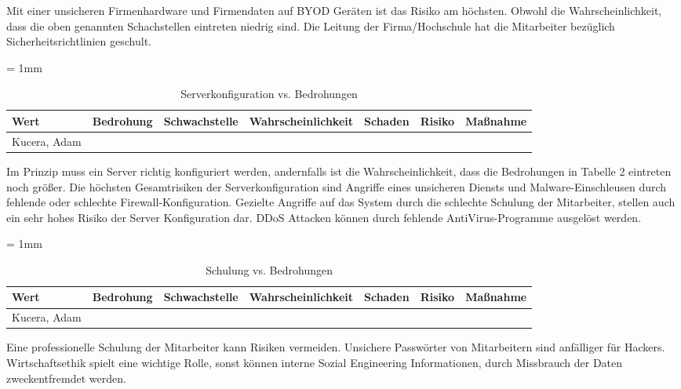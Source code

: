 Mit einer unsicheren Firmenhardware und Firmendaten auf BYOD Geräten ist das Risiko am höchsten. Obwohl die Wahrscheinlichkeit, dass die oben genannten Schachstellen eintreten niedrig sind. Die Leitung der Firma/Hochschule hat die Mitarbeiter bezüglich Sicherheitsrichtlinien geschult.

\begin{table}[H]
	\sffamily
	\caption{Serverkonfiguration vs. Bedrohungen}
	\tabulinesep = 1mm %
	\centering
		\begin{tabu} to 0.9\textwidth {| X[1] | X[1] | X[1] | X[1] | X[1] | X[1] | X[1] |}
		\hline
		\textbf{Wert} & \textbf{Bedrohung} & \textbf{Schwachstelle} & \textbf{Wahrscheinlichkeit} & \textbf{Schaden} & \textbf{Risiko} & \textbf{Maßnahme}\\
		\hline 
		Kucera, Adam &  & & & & &\\
		\hline
	\end{tabu}
\end{table}

Im Prinzip muss ein Server richtig konfiguriert werden, andernfalls ist die Wahrscheinlichkeit, dass die Bedrohungen in Tabelle 2 eintreten noch größer. 
Die höchsten Gesamtrisiken der Serverkonfiguration sind Angriffe eines unsicheren Diensts und Malware-Einschleusen durch fehlende oder schlechte Firewall-Konfiguration. 
Gezielte Angriffe auf das System durch die schlechte Schulung der Mitarbeiter, stellen auch ein sehr hohes Risiko der Server Konfiguration dar.  DDoS Attacken können durch fehlende AntiVirus-Programme ausgelöst werden.

\begin{table}[H]
	\sffamily
	\caption{Schulung vs. Bedrohungen}
	\tabulinesep = 1mm %
	\centering
		\begin{tabu} to 0.9\textwidth {| X[1] | X[1] | X[1] | X[1] | X[1] | X[1] | X[1] |}
		\hline
		\textbf{Wert} & \textbf{Bedrohung} & \textbf{Schwachstelle} & \textbf{Wahrscheinlichkeit} & \textbf{Schaden} & \textbf{Risiko} & \textbf{Maßnahme}\\
		\hline 
		Kucera, Adam &  & & & & &\\
		\hline
	\end{tabu}
\end{table}

Eine professionelle Schulung der Mitarbeiter kann Risiken vermeiden.
Unsichere Passwörter von Mitarbeitern sind anfälliger für Hackers. Wirtschaftsethik spielt  eine wichtige Rolle, sonst können interne Sozial Engineering Informationen, durch Missbrauch der Daten zweckentfremdet werden.

